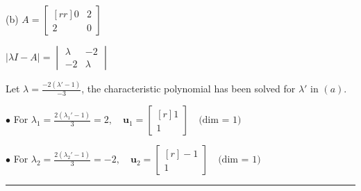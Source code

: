 \documentclass{article}
\newcommand\ddfrac[2]{\frac{\displaystyle #1}{\displaystyle #2}}
\begin{document}
    \begin{minipage}{0.48\linewidth}
        (b) $A = \begin{bmatrix}[rr]
            0 & 2 \\
            2 & 0 
        \end{bmatrix} $

    $| \lambda I - A| = \begin{vmatrix}
        \lambda  & -2 \\
        -2 & \lambda  
    \end{vmatrix}$

    Let $\lambda = \ddfrac{-2(\lambda' - 1)}{-3} $, the characteristic polynomial has been solved for $\lambda'$ in $(a)$.
    
    $\bullet$ For $ \lambda _1 = \ddfrac{2(\lambda_1' - 1)}{3} = 2, \quad \textbf{u}_1 = \begin{bmatrix}[r]
        1 \\
        1 
    \end{bmatrix} \quad \text{(dim = 1)}$


    $\bullet$ For $ \lambda _2 = \ddfrac{2(\lambda_2' - 1)}{3} = -2, \quad \textbf{u}_2 = \begin{bmatrix}[r]
        -1 \\
        1 
    \end{bmatrix} \quad \text{(dim = 1)}$


    \end{minipage}

    {\color{blue9} \rule{20cm}{0.3mm}}

    

\end{document}
